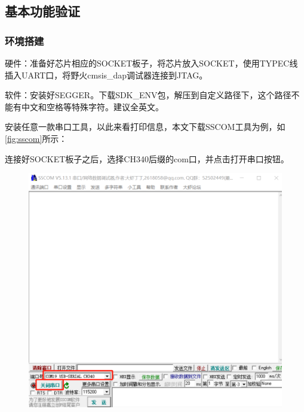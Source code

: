\vspace{\baselineskip}
\vspace{0.5cm} 

\clearpage
\subsection{基本功能验证}
\subsubsection{环境搭建}
硬件：准备好芯片相应的SOCKET板子，将芯片放入SOCKET，使用TYPEC线插入UART口，将野火cmsis\_dap调试器连接到JTAG。\par
软件：安装好SEGGER。下载SDK\_ENV包，解压到自定义路径下，这个路径不能有中文和空格等特殊字符。建议全英文。\par
安装任意一款串口工具，以此来看打印信息，本文下载SSCOM工具为例，如\autoref{fig:sscom}所示：\par
连接好SOCKET板子之后，选择CH340后缀的com口，并点击打开串口按钮。
\vspace{\baselineskip}
\vspace{0.3cm}
\begin{figure}[H]
	\centering
	\includegraphics[width=0.7\linewidth]{img/sscom}
	\caption{}
	\label{fig:sscom}
\end{figure}
\vspace{\baselineskip}
\vspace{0.3cm} 



